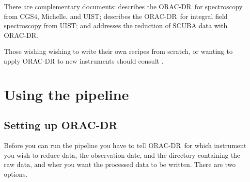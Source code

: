 \documentclass[twoside,11pt,nolof]{starlink}
\providecommand{\ORACDR}{{\footnotesize ORAC-DR}}
\begin{document}
There are complementary documents:  describes the
\ORACDR\ for spectroscopy from CGS4, Michelle, and UIST; 
describes the \ORACDR\ for integral field spectroscopy from UIST;
and  addresses the reduction of SCUBA data with \ORACDR.



Those wishing wishing to write their own recipes from scratch, or wanting
to apply ORAC-DR to new instruments should consult .

\section{Using the pipeline\label{using_the_pipeline}}

\subsection{Setting up \ORACDR\label{setting_up_orac-dr}}

Before you can run the pipeline you have to tell \ORACDR\ for which
instrument you wish to reduce data, the observation date, and the
directory containing the raw data, and wher you want the processed
data to be written.  There are two options.
\end{document}
